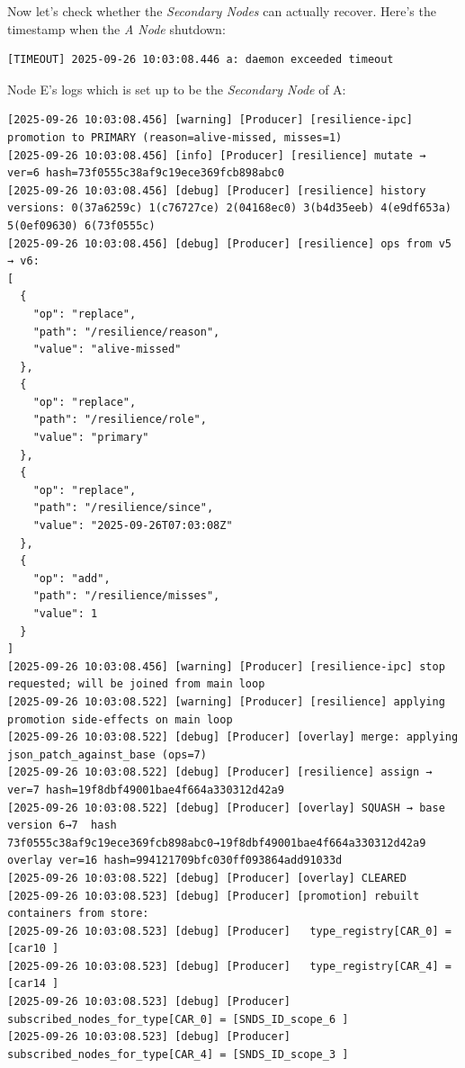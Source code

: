 \documentclass{article}
\begin{document}
Now let's check whether the \emph{Secondary Nodes} can actually recover. Here's the timestamp when the \emph{A Node} shutdown: 

\begin{lstlisting}[language=log, caption={A's timeout timestamp}, label={lst:a-timeout-timestamp}]
[TIMEOUT] 2025-09-26 10:03:08.446 a: daemon exceeded timeout 
\end{lstlisting}

Node E's logs which is set up to be the \emph{Secondary Node} of A:

\begin{lstlisting}[language=log, caption={E's recovery logs}, label={lst:e-recovery-logs}]
[2025-09-26 10:03:08.456] [warning] [Producer] [resilience-ipc] promotion to PRIMARY (reason=alive-missed, misses=1)
[2025-09-26 10:03:08.456] [info] [Producer] [resilience] mutate → ver=6 hash=73f0555c38af9c19ece369fcb898abc0
[2025-09-26 10:03:08.456] [debug] [Producer] [resilience] history versions: 0(37a6259c) 1(c76727ce) 2(04168ec0) 3(b4d35eeb) 4(e9df653a) 5(0ef09630) 6(73f0555c) 
[2025-09-26 10:03:08.456] [debug] [Producer] [resilience] ops from v5 → v6:
[
  {
    "op": "replace",
    "path": "/resilience/reason",
    "value": "alive-missed"
  },
  {
    "op": "replace",
    "path": "/resilience/role",
    "value": "primary"
  },
  {
    "op": "replace",
    "path": "/resilience/since",
    "value": "2025-09-26T07:03:08Z"
  },
  {
    "op": "add",
    "path": "/resilience/misses",
    "value": 1
  }
]
[2025-09-26 10:03:08.456] [warning] [Producer] [resilience-ipc] stop requested; will be joined from main loop
[2025-09-26 10:03:08.522] [warning] [Producer] [resilience] applying promotion side-effects on main loop
[2025-09-26 10:03:08.522] [debug] [Producer] [overlay] merge: applying json_patch_against_base (ops=7)
[2025-09-26 10:03:08.522] [debug] [Producer] [resilience] assign → ver=7 hash=19f8dbf49001bae4f664a330312d42a9
[2025-09-26 10:03:08.522] [debug] [Producer] [overlay] SQUASH → base version 6→7  hash 73f0555c38af9c19ece369fcb898abc0→19f8dbf49001bae4f664a330312d42a9  overlay ver=16 hash=994121709bfc030ff093864add91033d
[2025-09-26 10:03:08.522] [debug] [Producer] [overlay] CLEARED
[2025-09-26 10:03:08.523] [debug] [Producer] [promotion] rebuilt containers from store:
[2025-09-26 10:03:08.523] [debug] [Producer]   type_registry[CAR_0] = [car10 ]
[2025-09-26 10:03:08.523] [debug] [Producer]   type_registry[CAR_4] = [car14 ]
[2025-09-26 10:03:08.523] [debug] [Producer]   subscribed_nodes_for_type[CAR_0] = [SNDS_ID_scope_6 ]
[2025-09-26 10:03:08.523] [debug] [Producer]   subscribed_nodes_for_type[CAR_4] = [SNDS_ID_scope_3 ]

\end{lstlisting}
\end{document}
